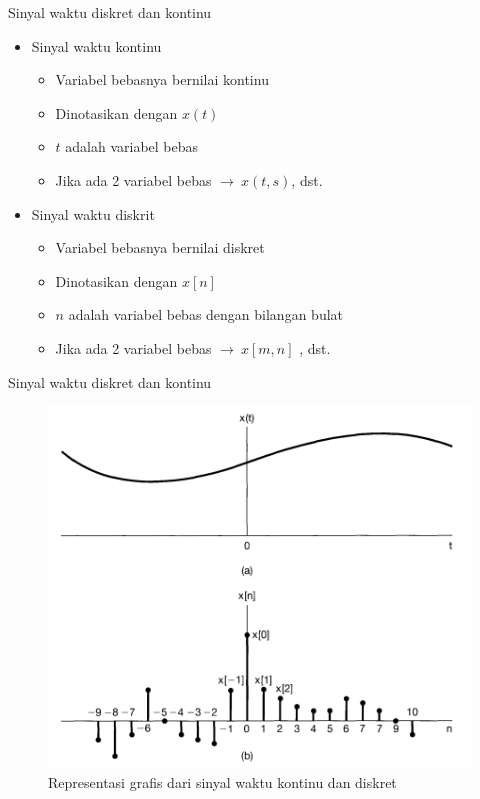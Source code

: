 \documentclass[pdflatex,compress,mathserif]{beamer}
\begin{document}
\begin{frame}{Sinyal waktu diskret dan kontinu}
	\begin{itemize}
		\item Sinyal waktu kontinu
		\begin{itemize}
			\item Variabel bebasnya bernilai kontinu
			\item Dinotasikan dengan $ x(t) $
			\item $ t $ adalah variabel bebas
			\item Jika ada 2 variabel bebas $ \rightarrow ~ x(t,s) $, dst.
		\end{itemize}
		\item Sinyal waktu diskrit
		\begin{itemize}
			\item Variabel bebasnya bernilai diskret
			\item Dinotasikan dengan $ x[n] $
			\item $ n $ adalah variabel bebas dengan bilangan bulat
			\item Jika ada 2 variabel bebas $ \rightarrow ~ x[m,n] $ , dst.
		\end{itemize}
	\end{itemize}
\end{frame}

\begin{frame}{Sinyal waktu diskret dan kontinu}
	\begin{figure}
		\centering
		\includegraphics[width=0.5\linewidth]{img/00.representasi_grafis_dari_sinyal_waktu_kontinu_dan_diskret}
		\caption{Representasi grafis dari sinyal waktu kontinu dan diskret}
	\end{figure}
\end{frame}
\end{document}
